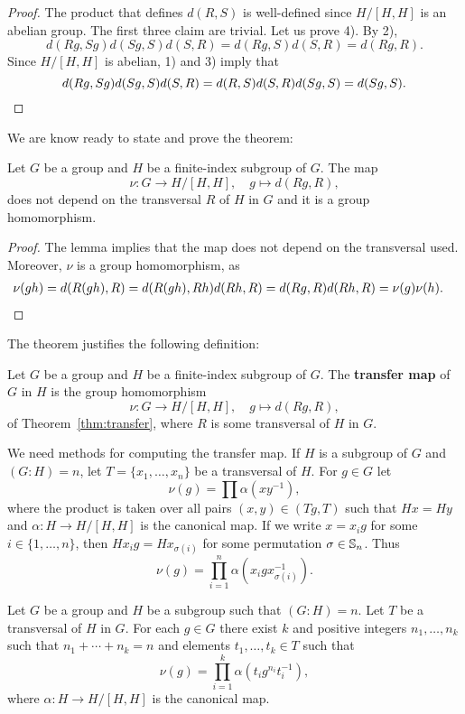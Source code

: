 \begin{proof}
	The product that defines $d(R,S)$ is well-defined since $H/[H,H]$ is 
	an abelian group. The first three claim are trivial. Let us prove
	4). By 2), 
	\[
		d(Rg,Sg)d(Sg,S)d(S,R)=d(Rg,S)d(S,R)=d(Rg,R).
	\]
	Since $H/[H,H]$ is abelian, 1) and 3) imply that 	
	\[
		d(Rg,Sg)d(Sg,S)d(S,R)=d(R,S)d(S,R)d(Sg,S)=d(Sg,S).\qedhere
	\]
\end{proof}

We are know ready to state and 
prove the theorem: 

\begin{theorem}
	\label{thm:transfer}
	Let $G$ be a group and $H$ be a finite-index subgroup of $G$. The map 	
	\[
		\nu\colon G\to H/[H,H],\quad
		g\mapsto d(Rg,R),
	\]
	does not depend on the transversal $R$ of $H$ in $G$ and it is a group
	homomorphism. 
\end{theorem}

\begin{proof}
	The lemma implies that the map does not depend on the transversal used. 
	Moreover, $\nu$ is a group homomorphism, as 
	\begin{align*}
		\nu(gh)&=d(R(gh),R)
		=d(R(gh),Rh)d(Rh,R)
		=d(Rg,R)d(Rh,R)=\nu(g)\nu(h).\qedhere
	\end{align*}
\end{proof}

The theorem justifies the following definition: 

\begin{definition}
	Let $G$ be a group and $H$ be a finite-index subgroup of $G$. The
	\textbf{transfer map} of $G$ in $H$ is the group homomorphism 
	\[
		\nu\colon G\to H/[H,H],
		\quad
		g\mapsto d(Rg,R),
	\]
	of Theorem~\ref{thm:transfer}, where $R$ is some transversal of $H$ in $G$.
\end{definition}

We need methods for computing the transfer map. If $H$ is a subgroup of 
$G$
and $(G:H)=n$, let $T=\{x_1,\dots,x_n\}$ be a transversal of $H$. For $g\in G$ let  
\[
	\nu(g)=\prod \alpha(xy^{-1}),
\]
where the product is taken over all pairs $(x,y)\in (Tg,T)$ such that $Hx=Hy$
and $\alpha\colon H\to H/[H,H]$ is the canonical map. 
If we write 
$x=x_ig$ for some $i\in\{1,\dots,n\}$, then  
$Hx_ig=Hx_{\sigma(i)}$ for some permutation $\sigma\in\mathbb{S}_n$. Thus 
\[
	\nu(g)=\prod_{i=1}^n\alpha(x_igx_{\sigma(i)}^{-1}).
\]

\begin{lemma}
	\label{lem:transfer}
	Let $G$ be a group and $H$ be a subgroup such that $(G:H)=n$. Let 
	$T$ be a transversal of $H$ in $G$. 
	For each $g\in G$ there exist $k$ and 
	positive integers 
	$n_1,\dots,n_k$ such that $n_1+\cdots+n_k=n$ and elements 
	$t_1,\dots,t_k\in T$ such that  
	\[
		\nu(g)=\prod_{i=1}^k \alpha(t_ig^{n_i}t_i^{-1}),
	\]
	where $\alpha\colon H\to H/[H,H]$ is the canonical map.
\end{lemma}


